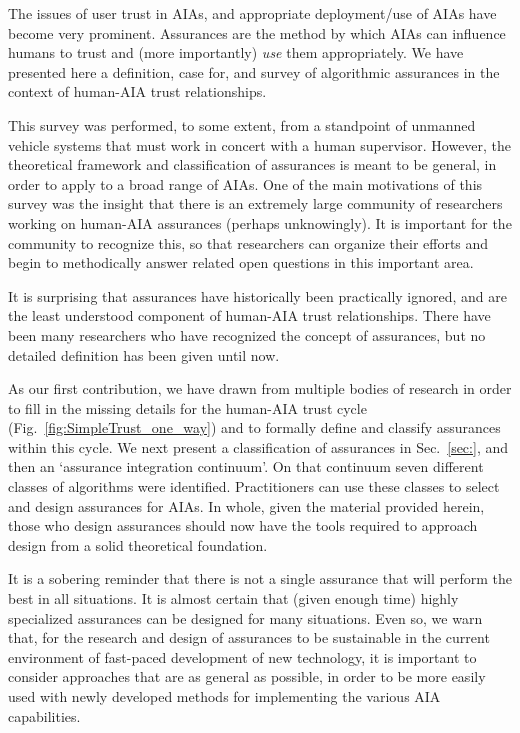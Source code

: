 The issues of user trust in AIAs, and appropriate deployment/use of AIAs have become very prominent. Assurances are the method by which AIAs can influence humans to trust and (more importantly) \emph{use} them appropriately. We have presented here a definition, case for, and survey of algorithmic assurances in the context of human-AIA trust relationships. 
    
This survey was performed, to some extent, from a standpoint of unmanned vehicle systems that must work in concert with a human supervisor. However, the theoretical framework and classification of assurances is meant to be general, in order to apply to a broad range of AIAs. One of the main motivations of this survey was the insight that there is an extremely large community of researchers working on human-AIA assurances (perhaps unknowingly). It is important for the community to recognize this, so that researchers can organize their efforts and begin to methodically answer related open questions in this important area.

It is surprising that assurances have historically been practically ignored, and are the least understood component of human-AIA trust relationships. There have been many researchers who have recognized the concept of assurances, but no detailed definition has been given until now.

As our first contribution, we have drawn from multiple bodies of research in order to fill in the missing details for the human-AIA trust cycle (Fig.~\ref{fig:SimpleTrust_one_way}) and to formally define and classify assurances within this cycle. We next present a classification of assurances in Sec.~\ref{sec:}, and then an `assurance integration continuum'. On that continuum seven different classes of algorithms were identified. Practitioners can use these classes to select and design assurances for AIAs. In whole, given the material provided herein, those who design assurances should now have the tools required to approach design from a solid theoretical foundation.

It is a sobering reminder that there is not a single assurance that will perform the best in all situations. It is almost certain that (given enough time) highly specialized assurances can be designed for many situations. Even so, we warn that, for the research and design of assurances to be sustainable in the current environment of fast-paced development of new technology, it is important to consider approaches that are as general as possible, in order to be more easily used with newly developed methods for implementing the various AIA capabilities.

